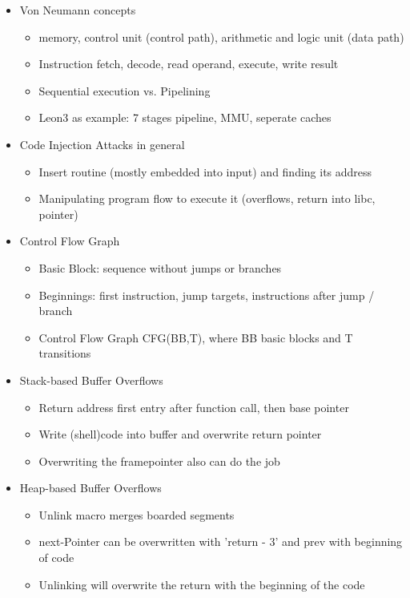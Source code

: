 \documentclass[11pt, paper=a4, twocolumn]{scrartcl}
\begin{document}
		\begin{itemize}
			\item Von Neumann concepts
				\begin{itemize}
					\item memory, control unit (control path), arithmetic and logic unit  (data path)
					\item Instruction fetch, decode, read operand, execute, write result
					\item Sequential execution vs. Pipelining
					\item Leon3 as example: 7 stages pipeline, MMU, seperate caches
				\end{itemize}
			\item Code Injection Attacks in general
				\begin{itemize}
					\item Insert routine (mostly embedded into input) and finding its address
					\item Manipulating program flow to execute it (overflows, return into libc, pointer)
				\end{itemize}
			\item Control Flow Graph
				\begin{itemize}
					\item Basic Block: sequence without jumps or branches
					\item Beginnings: first instruction, jump targets, instructions after jump / branch
					\item Control Flow Graph CFG(BB,T), where BB basic blocks and T transitions
				\end{itemize}
			\item Stack-based Buffer Overflows
				\begin{itemize}
					\item Return address first entry after function call, then base pointer
					\item Write (shell)code into buffer and overwrite return pointer
					\item Overwriting the framepointer also can do the job
				\end{itemize}
			\item Heap-based Buffer Overflows
				\begin{itemize}
					\item Unlink macro merges boarded segments
					\item next-Pointer can be overwritten with 'return - 3' and prev with beginning of code
					\item Unlinking will overwrite the return with the beginning of the code

\end{itemize}
\end{itemize}
\end{document}
